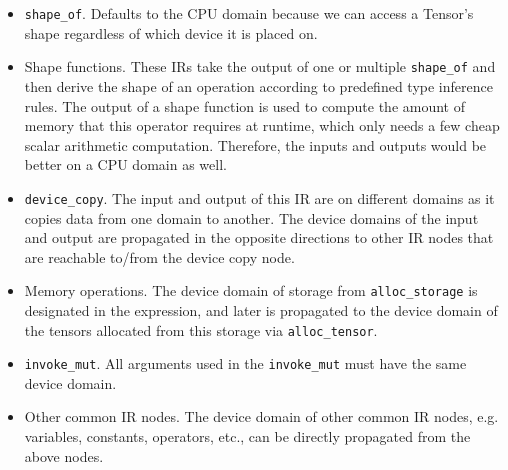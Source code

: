 \begin{itemize}
    \item \verb|shape_of|. Defaults to the CPU domain because we can access a Tensor's shape regardless of which device it is placed on.
    \item Shape functions. These IRs take the output of one or multiple \verb|shape_of| and then derive the shape of an operation according to predefined type inference rules. The output of a shape function is used to compute the amount of memory that this operator requires at runtime, which only needs a few cheap scalar arithmetic computation. Therefore, the inputs and outputs would be better on a CPU domain as well.
    \item \verb|device_copy|. The input and output of this IR are on different domains as it copies data from one domain to another. The device domains of the input and output are propagated in the opposite directions to other IR nodes that are reachable to/from the device copy node.
    \item Memory operations. The device domain of storage from \verb|alloc_storage| is designated in the expression, and later is propagated to the device domain of the tensors allocated from this storage via \verb|alloc_tensor|.
    \item \verb|invoke_mut|. All arguments used in the \verb|invoke_mut| must have the same device domain.
    \item Other common IR nodes. The device domain of other common IR nodes, e.g. variables, constants, operators, etc., can be directly propagated from the above nodes.
\end{itemize}


%

